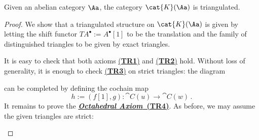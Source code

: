 \begin{prop}
    Given an abelian category $\Aa$, the category $\cat{K}(\Aa)$ is triangulated.
    \begin{proof}
        We show that a triangulated structure on $\cat{K}(\Aa)$ is given 
        by letting the shift functor $TA^{\bullet} := A^{\bullet}[1]$
        to be the translation and the family of distinguished triangles
        to be given by exact triangles.

        It is easy to check that both axioms \hyperref[TR1]{(\textbf{TR1})}
        and \hyperref[TR2]{(\textbf{TR2})} hold. Without loss of generality,
        it is enough to check \hyperref[TR3]{(\textbf{TR3})} on
        strict triangles: the diagram
        \begin{center}
        \end{center}
        can be completed by defining the cochain map
        \begin{equation*}
            h := (f[1],g) : \cat{C}(u) \longrightarrow \cat{C}(w)\,.
        \end{equation*}
        It remains to prove the \hyperref[TR4]{\textbf{\emph{Octahedral Axiom}~(\textbf{TR4})}}.
        As before, we may assume the given triangles are strict:
        \begin{center}
        \end{center}

\end{proof}
\end{prop}
